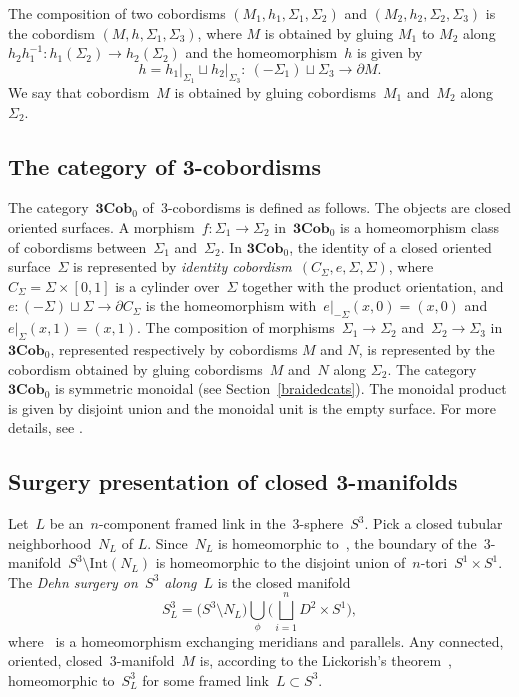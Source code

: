 \documentclass[pdftex]{sigma}
\numberwithin{equation}{section}
\newcommand{\co}{\colon}
\newcommand{\Cob}{\textbf{Cob}}
\begin{document}
The composition of two cobordisms $(M_1,h_1,\Sigma_1,\Sigma_2)$ and $(M_2,h_2,\Sigma_2,\Sigma_3)$ is the cobordism $(M,h,\Sigma_1,\Sigma_3)$, where $M$ is obtained by gluing $M_1$ to $M_2$ along $h_2h_1^{-1}\co h_1(\Sigma_2) \to h_2(\Sigma_2)$ and the homeomorphism~$h$ is given by
\[
h=h_1\vert_{\Sigma_1} \sqcup h_2\vert_{\Sigma_3} \co\ (-\Sigma_1) \sqcup \Sigma_3 \to \partial M.
\]
We say that cobordism~$M$ is obtained by gluing cobordisms~$M_1$ and~$M_2$ along~$\Sigma_2$.

\subsection{The category of 3-cobordisms}\label{sect-cob3}
The category~$\textbf{3}\Cob_0$ of~$3$-cobordisms is defined as follows.
The objects are closed oriented surfaces.
A morphism~$f\co \Sigma_1 \to \Sigma_2$ in~$\textbf{3}\Cob_0$ is a homeomorphism class of cobordisms between~$\Sigma_1$ and~$\Sigma_2$.
In $\textbf{3}\Cob_0$, the identity of a closed oriented surface~$\Sigma$ is re\-presented by \emph{identity cobordism}~$(C_\Sigma,e,\Sigma,\Sigma)$, where~$C_\Sigma=\Sigma\times [0,1]$ is a cylinder over~$\Sigma$ together with the product orientation, and~$e\co (-\Sigma)\sqcup \Sigma \to \partial C_{\Sigma}$ is the homeomorphism with~$e\vert_{-\Sigma}(x,0)=(x,0)$ and~$e\vert_{\Sigma}(x,1)=(x,1)$.
The composition of morphisms~$\Sigma_1\to \Sigma_2$ and~$\Sigma_2 \to \Sigma_3$ in~$\textbf{3}\Cob_0$, re\-presented respectively by cobordisms $M$ and $N$, is re\-presented by the cobordism obtained by gluing cobordisms~$M$ and~$N$ along $\Sigma_2$.
The category~$\textbf{3}\Cob_0$ is symmetric monoidal (see Section~\ref{braidedcats}). The monoidal product is given by disjoint
union and the monoidal unit is the empty surface. For more details, see \cite{moncatstft}.

\subsection{Surgery presentation of closed 3-manifolds} \label{dehn}
Let~$L$ be an~$n$-component framed link in the~$3$-sphere~$S^3$. Pick a closed tubular neighborhood~$N_L$ of $L$.
Since~$N_L$ is ho\-meo\-morphic to~, the boundary of the~$3$-manifold~$S^3 \setminus \mathrm{Int}(N_L)$ is homeomorphic to the disjoint union of~$n$-tori~$S^1 \times S^1$.
The \textit{Dehn surgery on~$S^3$ along}~$L$ is the closed manifold
\[
S^3_L=\bigl(S^3\setminus N_L\bigr)\bigcup_{\phi} \biggr(\bigsqcup_{i=1}^n D^2\times S^1\biggr),
\]
where~\smash{$\phi\co \partial\bigl(S^3\setminus \mathrm{Int}(N_L)\bigr)\to \bigsqcup_{i=1}^n S^1\times S^1$} is a ho\-me\-o\-mor\-phism ex\-changing me\-ri\-dians and pa\-ral\-lels.
Any connected, oriented, closed~$3$-manifold~$M$ is, according to the Lickorish's theorem~\cite[Section~12]{lickorish97}, homeomorphic to~$S^3_L$ for some framed link~$L\subset S^3$.
\end{document}
